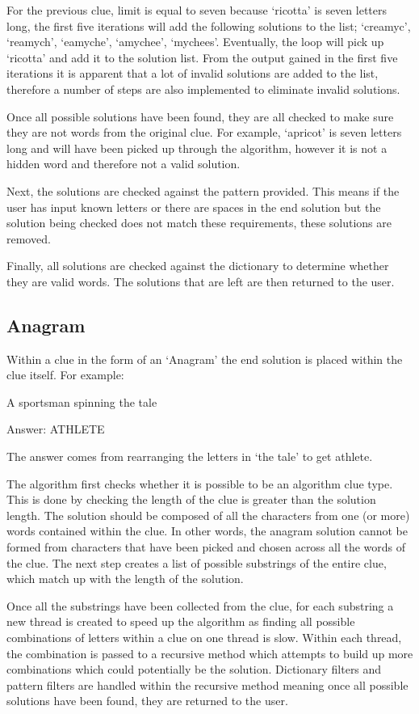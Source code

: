 For the previous clue, limit is equal to seven because `ricotta' is seven
letters  long, the first five iterations will add the following solutions to the
list; `creamyc',  `reamych', `eamyche', `amychee', `mychees'. Eventually, the
loop will pick up  `ricotta' and add it to the solution list. From the output
gained in the first five  iterations it is apparent that a lot of invalid
solutions are added to the list, therefore a number of steps are also
implemented to eliminate invalid solutions.

Once all possible solutions have been found, they are all checked to make sure
they are not words from the original clue. For example, `apricot' is seven
letters long and will  have been picked up through the algorithm, however it is
not a hidden word and therefore  not a valid solution.

Next, the solutions are checked against the pattern provided. This means if the
user  has input known letters or there are spaces in the end solution but the
solution being  checked does not match these requirements, these solutions are
removed.

Finally, all solutions are checked against the dictionary to determine whether
they  are valid words. The solutions that are left are then returned to the
user.

\subsection{Anagram}

Within a clue in the form of an `Anagram' the end solution is placed within 
the clue itself. For example:

A sportsman spinning the tale

Answer: ATHLETE

The answer comes from rearranging the letters in `the tale' to get athlete.

The algorithm first checks whether it is possible to be an algorithm clue type. This 
is done by checking the length of the clue is greater than the solution length.
 The solution should be composed of all the characters from one (or more)
 words contained within the clue. In other words, the anagram solution
 cannot be formed from characters that have been picked and chosen across
 all the words of the clue. The next step creates a list of possible
 substrings of the entire clue, which match up with the length of the solution.

Once all the substrings have been collected from the clue, for each substring 
a new thread is created to speed up the algorithm as finding all possible 
combinations of letters within a clue on one thread is slow. Within each thread, 
the combination is passed to a recursive method which attempts to build up 
more combinations which could potentially be the solution. Dictionary filters 
and pattern filters are handled within the recursive method meaning 
once all possible solutions have been found, they are returned to the user. 


